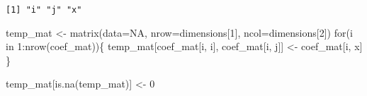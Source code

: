 \documentclass[
  letterpaper,
  DIV=11,
  numbers=noendperiod]{scrartcl}
\newenvironment{Shaded}{\begin{snugshade}}{\end{snugshade}}
\newcommand{\AttributeTok}[1]{\textcolor[rgb]{0.40,0.45,0.13}{#1}}
\newcommand{\CommentTok}[1]{\textcolor[rgb]{0.37,0.37,0.37}{#1}}
\newcommand{\ConstantTok}[1]{\textcolor[rgb]{0.56,0.35,0.01}{#1}}
\newcommand{\ControlFlowTok}[1]{\textcolor[rgb]{0.00,0.23,0.31}{#1}}
\newcommand{\DecValTok}[1]{\textcolor[rgb]{0.68,0.00,0.00}{#1}}
\newcommand{\FunctionTok}[1]{\textcolor[rgb]{0.28,0.35,0.67}{#1}}
\newcommand{\NormalTok}[1]{\textcolor[rgb]{0.00,0.23,0.31}{#1}}
\newcommand{\OtherTok}[1]{\textcolor[rgb]{0.00,0.23,0.31}{#1}}
\newcommand{\SpecialCharTok}[1]{\textcolor[rgb]{0.37,0.37,0.37}{#1}}
\newcommand{\StringTok}[1]{\textcolor[rgb]{0.13,0.47,0.30}{#1}}
\begin{document}
\begin{Shaded}
\end{Shaded}

\begin{Shaded}
\end{Shaded}

\begin{verbatim}
[1] "i" "j" "x"
\end{verbatim}

\begin{Shaded}
\begin{Highlighting}[]
\NormalTok{temp\_mat }\OtherTok{\textless{}{-}} \FunctionTok{matrix}\NormalTok{(}\AttributeTok{data=}\ConstantTok{NA}\NormalTok{, }\AttributeTok{nrow=}\NormalTok{dimensions[}\DecValTok{1}\NormalTok{], }\AttributeTok{ncol=}\NormalTok{dimensions[}\DecValTok{2}\NormalTok{])}
\ControlFlowTok{for}\NormalTok{(i }\ControlFlowTok{in} \DecValTok{1}\SpecialCharTok{:}\FunctionTok{nrow}\NormalTok{(coef\_mat))\{}
\NormalTok{    temp\_mat[coef\_mat[i, }\StringTok{\textquotesingle{}i\textquotesingle{}}\NormalTok{], coef\_mat[i, }\StringTok{\textquotesingle{}j\textquotesingle{}}\NormalTok{]] }\OtherTok{\textless{}{-}}\NormalTok{ coef\_mat[i, }\StringTok{\textquotesingle{}x\textquotesingle{}}\NormalTok{]}
\NormalTok{\}}

\NormalTok{temp\_mat[}\FunctionTok{is.na}\NormalTok{(temp\_mat)] }\OtherTok{\textless{}{-}} \DecValTok{0}
\end{Highlighting}
\end{Shaded}
\end{document}
